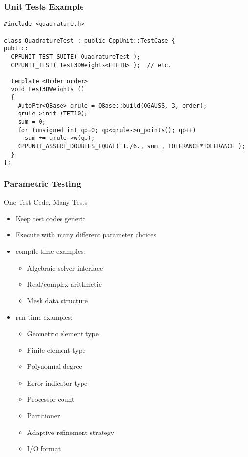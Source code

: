 \begin{frame}[fragile]
\frametitle{Unit Tests Example}
{\footnotesize
\begin{verbatim}
#include <quadrature.h>

class QuadratureTest : public CppUnit::TestCase {
public:
  CPPUNIT_TEST_SUITE( QuadratureTest );
  CPPUNIT_TEST( test3DWeights<FIFTH> );  // etc.

  template <Order order>
  void test3DWeights ()
  {
    AutoPtr<QBase> qrule = QBase::build(QGAUSS, 3, order);
    qrule->init (TET10);
    sum = 0;
    for (unsigned int qp=0; qp<qrule->n_points(); qp++)
      sum += qrule->w(qp);
    CPPUNIT_ASSERT_DOUBLES_EQUAL( 1./6., sum , TOLERANCE*TOLERANCE );
  }
};
\end{verbatim}
}
\end{frame}

\begin{frame}
\frametitle{Parametric Testing}
\begin{block}{One Test Code, Many Tests}
\begin{itemize}
\item Keep test codes generic
\item Execute with many different parameter choices
\item \libMesh{} compile time examples:
\begin{itemize}
\item Algebraic solver interface
\item Real/complex arithmetic
\item Mesh data structure
\end{itemize}
\item \libMesh{} run time examples:
\begin{itemize}
\item Geometric element type
\item Finite element type
\item Polynomial degree
\item Error indicator type
\item Processor count
\item Partitioner
\item Adaptive refinement strategy
\item I/O format
\end{itemize}
\end{itemize}
\end{block}
\end{frame}

